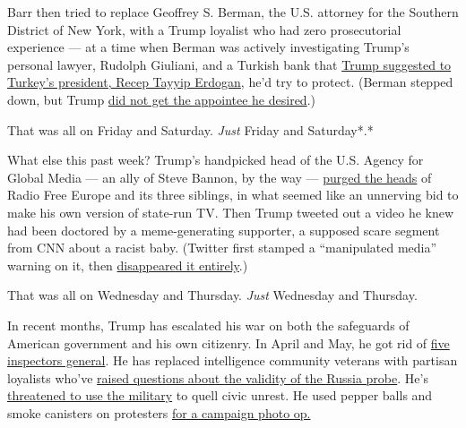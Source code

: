 Barr then tried to replace Geoffrey S. Berman, the U.S. attorney for the
Southern District of New York, with a Trump loyalist who had zero
prosecutorial experience --- at a time when Berman was actively
investigating Trump's personal lawyer, Rudolph Giuliani, and a Turkish
bank that
\href{https://abcnews.go.com/Politics/bolton-suggests-obstruction-trump-sdny-turkey-investigation/story?id=71362785}{Trump
suggested to Turkey's president, Recep Tayyip Erdogan}, he'd try to
protect. (Berman stepped down, but Trump
\href{https://www.nytimes3xbfgragh.onion/2020/06/20/nyregion/trump-geoffrey-berman-fired-sdny.html?action=click\&module=Top\%20Stories\&pgtype=Homepage}{did
not get the appointee he desired}.)

That was all on Friday and Saturday. \emph{Just} Friday and Saturday*.*

What else this past week? Trump's handpicked head of the U.S. Agency for
Global Media --- an ally of Steve Bannon, by the way ---
\href{https://www.nytimes3xbfgragh.onion/2020/06/17/us/politics/michael-pack-media-agency.htm}{purged
the heads} of Radio Free Europe and its three siblings, in what seemed
like an unnerving bid to make his own version of state-run TV. Then
Trump tweeted out a video he knew had been doctored by a meme-generating
supporter, a supposed scare segment from CNN about a racist baby.
(Twitter first stamped a ``manipulated media'' warning on it, then
\href{https://www.npr.org/sections/live-updates-protests-for-racial-justice/2020/06/19/880805065/twitter-flags-video-shared-by-trump-as-manipulated-media}{disappeared
it entirely}.)

That was all on Wednesday and Thursday. \emph{Just} Wednesday and
Thursday.

In recent months, Trump has escalated his war on both the safeguards of
American government and his own citizenry. In April and May, he got rid
of
\href{https://www.vox.com/2020/5/28/21265799/inspectors-general-trump-linick-atkinson}{five
inspectors general}. He has replaced intelligence community veterans
with partisan loyalists who've
\href{https://www.voanews.com/usa/trump-loyalist-confirmed-director-national-intelligence}{raised
questions about the validity of the Russia probe}. He's
\href{https://www.washingtonpost.com/national-security/can-trump-use-military-to-stop-protests-insurrection-act/2020/06/01/c3724380-a46b-11ea-b473-04905b1af82b_story.html}{threatened
to use the military} to quell civic unrest. He used pepper balls and
smoke canisters on protesters
\href{https://www.vox.com/2020/6/5/21281604/lafayette-square-white-house-tear-gas-protest}{for
a campaign photo op.}

